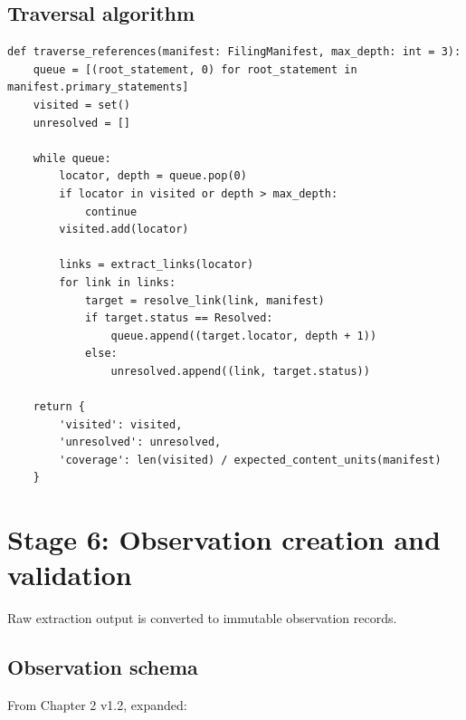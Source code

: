 \subsection{Traversal algorithm}

\begin{lstlisting}
def traverse_references(manifest: FilingManifest, max_depth: int = 3):
    queue = [(root_statement, 0) for root_statement in manifest.primary_statements]
    visited = set()
    unresolved = []

    while queue:
        locator, depth = queue.pop(0)
        if locator in visited or depth > max_depth:
            continue
        visited.add(locator)

        links = extract_links(locator)
        for link in links:
            target = resolve_link(link, manifest)
            if target.status == Resolved:
                queue.append((target.locator, depth + 1))
            else:
                unresolved.append((link, target.status))

    return {
        'visited': visited,
        'unresolved': unresolved,
        'coverage': len(visited) / expected_content_units(manifest)
    }
\end{lstlisting}

\section{Stage 6: Observation creation and validation}

Raw extraction output is converted to immutable observation records.

\subsection{Observation schema}

From Chapter 2 v1.2, expanded:

